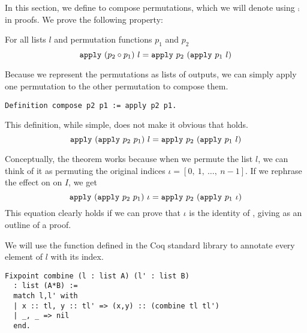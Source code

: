 \documentclass[sigplan,10pt,anonymous,review]{thesis}
\begin{document}
In this section, we define  to compose permutations,
which we will denote using $\comp$ in proofs. We prove the following
property:

\begin{theorem}
  For all lists $l$ and permutation functions $p_1$ and $p_2$
  \begin{equation*}
      \texttt{\textup{apply}}~(p_2 \circ p_1)~l = \texttt{\textup{apply}}~p_2~(\texttt{\textup{apply}}~p_1~l)
  \end{equation*}
\end{theorem}

Because we represent the permutations as lists of outputs, we can
simply apply one permutation to the other permutation to compose them.
\begin{lstlisting}
Definition compose p2 p1 := apply p2 p1.
\end{lstlisting}
This definition, while simple, does not make it obvious that
 holds.
\begin{equation}
  \label{eq:compose_apply}
  \texttt{\textup{apply}}~(\texttt{\textup{apply}}~p_2~p_1)~l = \texttt{\textup{apply}}~p_2~(\texttt{\textup{apply}}~p_1~l)
\end{equation}

Conceptually, the theorem works because when we permute the list $l$,
we can think of it as permuting the original indices $\iota =
[0,~1,~\ldots,~n-1]$. If we rephrase  the effect on
on $I$, we get
\begin{equation*}
  \texttt{\textup{apply}}~(\texttt{\textup{apply}}~p_2~p_1)~\iota = \texttt{\textup{apply}}~p_2~(\texttt{\textup{apply}}~p_1~\iota)
\end{equation*}
This equation clearly holds if we can prove that $\iota$ is the identity
of , giving as an outline of a proof.

We will use the function  defined in the Coq standard
library to annotate every element of $l$ with its index.
\begin{lstlisting}
Fixpoint combine (l : list A) (l' : list B)
  : list (A*B) :=
  match l,l' with
  | x :: tl, y :: tl' => (x,y) :: (combine tl tl')
  | _, _ => nil
  end.
\end{lstlisting}
\end{document}
